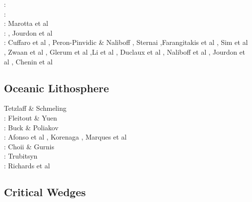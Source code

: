 \begin{scriptsize}
\twothousandsixteen: \cite{olbm16}\cite{jekm16}\cite{zwsn16}\\
\twothousandseventeen: \cite{lemh17}\cite{brcr17}\cite{bekb17}\cite{nabp17}\\
\twothousandeighteen: 
\cite{chsm18}\cite{brwm18}\cite{brun18}\cite{tebu18}\cite{jebu18}\cite{sahf18}\cite{pesn18}
      \cite{mord18}\cite{webe18}\cite{webe18b}\cite{gebu18} Marotta et al \cite{marc18}\\
\twothousandnineteen: \cite{lisp19}\cite{zwsb19}\cite{anpa19}\cite{dual19}\cite{mocb19}\cite{chmd19}\cite{thhu19}
      \cite{jala19}\cite{hooi19}\cite{lapk19}, Jourdon et al \cite{jolm19}\\
\twothousandtwenty: Cuffaro et al \cite{cump20}, Peron-Pinvidic \& Naliboff \cite{pena20}, 
                    Sternai \cite{ster20},Farangitakis et al \cite{fahm20}, Sim et al \cite{siss20}, 
                    Zwaan et al \cite{zwsr20}, Glerum et al \cite{glbs20},Li et al \cite{lial20}, 
                    Duclaux et al \cite{duhm20}, Naliboff et al \cite{nagb20}, Jourdon et al \cite{jolm20},
                    Chenin et al \cite{chsm20}
\end{scriptsize}


\subsection{Oceanic Lithosphere}

\begin{scriptsize}
\twothousand Tetzlaff \& Schmeling \cite{tesc00}\\
\nineteeneightyfour: Fleitout \& Yuen \cite{flyu84} \\
\nineteenninetyeight: Buck \& Poliakov \cite{bupo98}\\
\twothousandseven: Afonso et al \cite{afrf07}, Korenaga \cite{kore07}, Marques et al \cite{macl07}\\
\twothousandeight: Choii \& Gurnis \cite{chgu08}\\
\twothousandtwelve: Trubitsyn \cite{trub12} \\
\twothousandeighteen: Richards et al \cite{rihc18}
\end{scriptsize}


\subsection{Critical Wedges}

